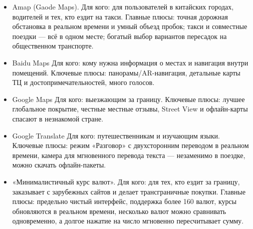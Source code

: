\begin{itemize}
  \item Amap (Gaode Maps). Для кого: для пользователей в китайских городах, водителей и тех, кто ездит на такси. Главные плюсы: точная дорожная обстановка в реальном времени и умный объезд пробок; такси и совместные поездки — всё в одном месте; богатый выбор вариантов пересадок на общественном транспорте.
  \item Baidu Maps Для кого: кому нужна информация о местах и навигация внутри помещений. Ключевые плюсы: панорамы/AR-навигация, детальные карты ТЦ и достопримечательностей, много голосов.
  \item Google Maps Для кого: выезжающим за границу. Ключевые плюсы: лучшее глобальное покрытие, честные местные отзывы, Street View и офлайн-карты спасают в незнакомой стране.
\end{itemize}


\begin{itemize}
  \item Google Translate Для кого: путешественникам и изучающим языки. Ключевые плюсы: режим «Разговор» с двухсторонним переводом в реальном времени, камера для мгновенного перевода текста — незаменимо в поездке, можно скачать офлайн-пакеты.
\end{itemize}


\begin{itemize}
  \item «Минималистичный курс валют». Для кого: для тех, кто ездит за границу, заказывает с зарубежных сайтов и делает трансграничные покупки. Главные плюсы: предельно чистый интерфейс, поддержка более 160 валют, курсы обновляются в реальном времени, несколько валют можно сравнивать одновременно, а долгое нажатие на число мгновенно пересчитывает сумму.
\end{itemize}


